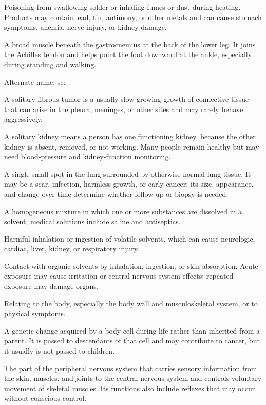  Poisoning from swallowing solder or inhaling fumes or dust during heating. Products may contain lead, tin, antimony, or other metals and can cause stomach symptoms, anemia, nerve injury, or kidney damage.

 A broad muscle beneath the gastrocnemius at the back of the lower leg. It joins the Achilles tendon and helps point the foot downward at the ankle, especially during standing and walking.

 Alternate name; see .

 A solitary fibrous tumor is a usually slow-growing growth of connective tissue that can arise in the pleura, meninges, or other sites and may rarely behave aggressively.

 A solitary kidney means a person has one functioning kidney, because the other kidney is absent, removed, or not working. Many people remain healthy but may need blood-pressure and kidney-function monitoring.

 A single small spot in the lung surrounded by otherwise normal lung tissue. It may be a scar, infection, harmless growth, or early cancer; its size, appearance, and change over time determine whether follow-up or biopsy is needed.

 A homogeneous mixture in which one or more substances are dissolved in a solvent; medical solutions include saline and antiseptics.

 Harmful inhalation or ingestion of volatile solvents, which can cause neurologic, cardiac, liver, kidney, or respiratory injury.

 Contact with organic solvents by inhalation, ingestion, or skin absorption. Acute exposure may cause
irritation or central nervous system effects; repeated exposure may damage organs.

 Relating to the body, especially the body wall and musculoskeletal system, or to physical symptoms.

 A genetic change acquired by a body cell during life rather than inherited from a parent. It is passed to descendants of that cell and may contribute to cancer, but it usually is not passed to children.

 The part of the peripheral nervous system that carries sensory information from the skin, muscles, and joints to the central nervous system and controls voluntary movement of skeletal muscles. Its functions also include reflexes that may occur without conscious control.


